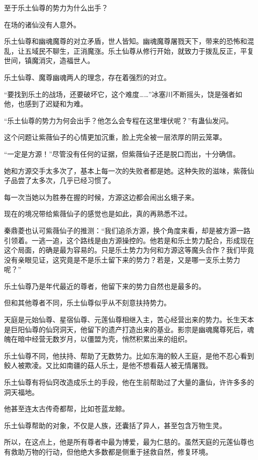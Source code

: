 \begin{this_body}
至于乐土仙尊的势力为什么出手？

在场的诸仙没有人意外。

乐土仙尊和幽魂魔尊的对立矛盾，世人皆知。幽魂魔尊屠戮天下，带来的恐怖和混乱，让五域民不聊生，正消魔涨。乐土仙尊从修行开始，就致力于拨乱反正，平复世间，镇魔消灾，造福世人。

乐土仙尊、魔尊幽魂两人的理念，存在着强烈的对立。

“要找到乐土的战场，还要破坏它，这个难度……”冰塞川不断摇头，饶是强者如他，也感到了迟疑和为难。

“乐土仙尊的势力为何会出手？他怎么会专程在这里埋伏呢？”有蛊仙发问。

这个问题让紫薇仙子的心情更加沉重，脸上完全被一层浓厚的阴云笼罩。

“一定是方源！”尽管没有任何的证据，但紫薇仙子还是脱口而出，十分确信。

她和方源交手太多次了，基本上每一次的失败者都是她。这种失败的滋味，紫薇仙子品尝了太多次，几乎已经习惯了。

每一次当她以为胜券在握的时候，方源这边都会闹出幺蛾子来。

现在的境况带给紫薇仙子的感觉也是如此，真的再熟悉不过。

秦鼎菱也认可紫薇仙子的推测：“我们追杀方源，换个角度来看，却是被方源一路引领着。一逃一追，这个路线是由方源操控的。他若是和乐土势力配合，形成现在这个局面，的确是最为容易的。只是乐土势力为何和方源这等魔头合作？我们毕竟没有亲眼见证，这究竟是不是乐土留下来的势力？若是，又是哪一支乐土势力呢？”

乐土仙尊乃是年代最近的尊者，他留下来的势力自然也是最多的。

但和其他尊者不同，乐土仙尊似乎从不刻意扶持势力。

天庭是元始仙尊、星宿仙尊、元莲仙尊相继入主，苦心经营出来的势力。长生天本是巨阳仙尊的仙窍洞天，他留下的遗产打造出来的基业。影宗是幽魂魔尊死后，魂魄在暗中经营无数岁月，以僵盟为壳，悄然积累出来的组织。

乐土仙尊不同，他扶持、帮助了无数势力。比如东海的鲛人王庭，是他不忍心看到鲛人被欺凌。又比如南疆的菇人乐土，是他不想看菇人被无情屠戮。

乐土仙尊有将仙窍改造成乐土的手段，他在生前帮助过了大量的蛊仙，许许多多的洞天福地。

他甚至连太古传奇都帮，比如苍蓝龙鲸。

乐土仙尊帮助的对象，不仅是人族，还囊括了异人，甚至包含万物生灵。

所以，在这点上，他是所有尊者中最为博爱，最为仁慈的。虽然天庭的元莲仙尊也有救助万物的行动，但他绝大多数都是侧重于拯救自然，修复环境。


\end{this_body}
